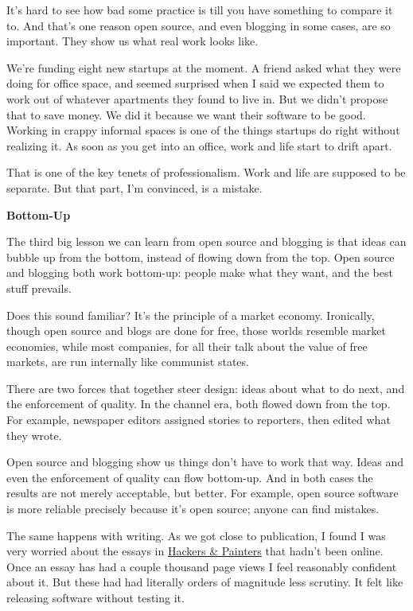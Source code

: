 \documentclass[12pt]{book}
\begin{document}
It's hard to see how bad some practice is till you have something to
compare it to. And that's one reason open source, and even blogging in
some cases, are so important. They show us what real work looks like.

We're funding eight new startups at the moment. A friend asked what they
were doing for office space, and seemed surprised when I said we
expected them to work out of whatever apartments they found to live in.
But we didn't propose that to save money. We did it because we want
their software to be good. Working in crappy informal spaces is one of
the things startups do right without realizing it. As soon as you get
into an office, work and life start to drift apart.

That is one of the key tenets of professionalism. Work and life are
supposed to be separate. But that part, I'm convinced, is a mistake.

\textbf{Bottom-Up}

The third big lesson we can learn from open source and blogging is that
ideas can bubble up from the bottom, instead of flowing down from the
top. Open source and blogging both work bottom-up: people make what they
want, and the best stuff prevails.

Does this sound familiar? It's the principle of a market economy.
Ironically, though open source and blogs are done for free, those worlds
resemble market economies, while most companies, for all their talk
about the value of free markets, are run internally like communist
states.

There are two forces that together steer design: ideas about what to do
next, and the enforcement of quality. In the channel era, both flowed
down from the top. For example, newspaper editors assigned stories to
reporters, then edited what they wrote.

Open source and blogging show us things don't have to work that way.
Ideas and even the enforcement of quality can flow bottom-up. And in
both cases the results are not merely acceptable, but better. For
example, open source software is more reliable precisely because it's
open source; anyone can find mistakes.

The same happens with writing. As we got close to publication, I found I
was very worried about the essays in
\href{http://www.amazon.com/exec/obidos/tg/detail/-/0596006624}{Hackers
\& Painters} that hadn't been online. Once an essay has had a couple
thousand page views I feel reasonably confident about it. But these had
had literally orders of magnitude less scrutiny. It felt like releasing
software without testing it.
\end{document}
